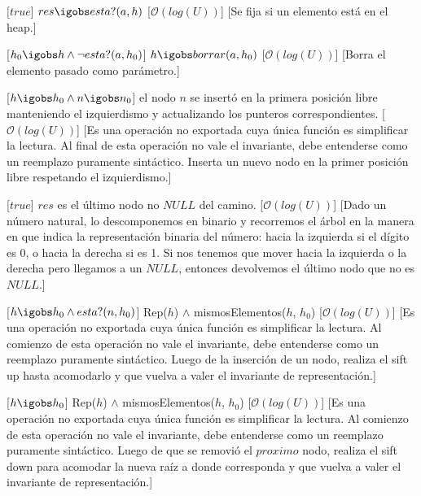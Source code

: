 \begin{Interfaz}
    [$true$]
    {$res \igobs esta?(a, h)$}
    [$\mathcal{O}(log(U))$]
    [Se fija si un elemento está en el heap.]

    [$h_0 \igobs h \wedge \neg esta?(a, h_0)$]
    {$h \igobs borrar(a, h_0)$}
    [$\mathcal{O}(log(U))$]
    [Borra el elemento pasado como parámetro.]


    [$h \igobs h_0 \wedge n \igobs n_0$]
    {el nodo $n$ se insertó en la primera posición libre manteniendo el izquierdismo y actualizando los punteros correspondientes.}
    [$\mathcal{O}(log(U))$]
    [Es una operación no exportada cuya única función es simplificar la lectura. Al final de esta operación no vale el invariante, debe entenderse como un reemplazo puramente sintáctico. Inserta un nuevo nodo en la primer posición libre respetando el izquierdismo.]

    [$true$]
    {$res$ es el último nodo no $NULL$ del camino.}
    [$\mathcal{O}(log(U))$]
    [Dado un número natural, lo descomponemos en binario y recorremos el árbol en la manera en que indica la representación binaria del número: hacia la izquierda si el dígito es 0, o hacia la derecha si es 1. Si nos tenemos que mover hacia la izquierda o la derecha pero llegamos a un $NULL$, entonces devolvemos el último nodo que no es $NULL$.]

    [$ h \igobs h_0 \wedge esta?(n, h_0) $]
    {Rep($h$) $\wedge$ mismosElementos($h$, $h_0$)}
    [$\mathcal{O}(log(U))$]
    [Es una operación no exportada cuya única función es simplificar la lectura. Al comienzo de esta operación no vale el invariante, debe entenderse como un reemplazo puramente sintáctico. Luego de la inserción de un nodo, realiza el sift up hasta acomodarlo y que vuelva a valer el invariante de representación.]

    [$ h \igobs h_0 $]
    {Rep($h$) $\wedge$ mismosElementos($h$, $h_0$)}
    [$\mathcal{O}(log(U))$]
    [Es una operación no exportada cuya única función es simplificar la lectura. Al comienzo de esta operación no vale el invariante, debe entenderse como un reemplazo puramente sintáctico. Luego de que se removió el $proximo$ nodo, realiza el sift down para acomodar la nueva raíz a donde corresponda y que vuelva a valer el invariante de representación.]


\end{Interfaz}
